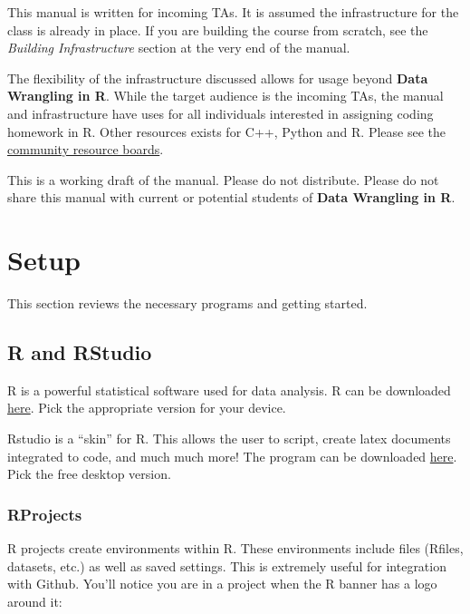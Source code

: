 \documentclass[
]{article}
\begin{document}
This manual is written for incoming TAs. It is assumed the
infrastructure for the class is already in place. If you are building
the course from scratch, see the \emph{Building Infrastructure} section
at the very end of the manual.

The flexibility of the infrastructure discussed allows for usage beyond
\textbf{Data Wrangling in R}. While the target audience is the incoming
TAs, the manual and infrastructure have uses for all individuals
interested in assigning coding homework in R. Other resources exists for
C++, Python and R. Please see the
\href{https://gradescope-autograders.readthedocs.io/en/latest/resources/}{community
resource boards}.

This is a working draft of the manual. Please do not distribute. Please
do not share this manual with current or potential students of
\textbf{Data Wrangling in R}.

\hypertarget{setup}{%
\section{Setup}\label{setup}}

This section reviews the necessary programs and getting started.

\hypertarget{r-and-rstudio}{%
\subsection{R and RStudio}\label{r-and-rstudio}}

R is a powerful statistical software used for data analysis. R can be
downloaded \href{https://cran.r-project.org/}{here}. Pick the
appropriate version for your device.

Rstudio is a ``skin'' for R. This allows the user to script, create
latex documents integrated to code, and much much more! The program can
be downloaded
\href{https://rstudio.com/products/rstudio/download/}{here}. Pick the
free desktop version.

\hypertarget{rprojects}{%
\subsubsection{RProjects}\label{rprojects}}

R projects create environments within R. These environments include
files (Rfiles, datasets, etc.) as well as saved settings. This is
extremely useful for integration with Github. You'll notice you are in a
project when the R banner has a logo around it:
\end{document}
